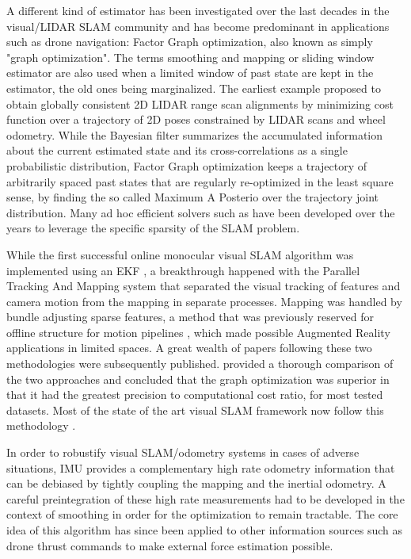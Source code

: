 A different kind of estimator has been investigated over the last decades in the visual/LIDAR SLAM community and has become predominant in applications
such as drone navigation: Factor Graph optimization, also known as simply "graph optimization". The terms smoothing and mapping or sliding window estimator are
also used when a limited window of past state are kept in the estimator, the old ones being marginalized. The earliest example \cite{lu1997globally} 
proposed to obtain globally consistent 2D LIDAR range scan alignments by minimizing cost function over a trajectory of 2D poses constrained by LIDAR scans and wheel odometry.
While the Bayesian filter summarizes the accumulated information about the current estimated state and its cross-correlations as a single probabilistic distribution, 
Factor Graph optimization keeps a trajectory of arbitrarily spaced past states that are regularly re-optimized in the least square sense, by finding the so called 
Maximum A Posterio over the trajectory joint distribution. Many ad hoc efficient solvers such as \cite{grisetti2011g2o, dellaert2012factor, ila2017slam++, ceres-solver} have been developed 
over the years to leverage the specific sparsity of the SLAM problem.

While the first successful online monocular visual SLAM algorithm was implemented using an EKF \cite{davison2007monoslam}, a breakthrough happened with the 
Parallel Tracking And Mapping system \cite{klein2009parallel} that separated the visual tracking of features and camera motion from the 
mapping in separate processes. Mapping was handled by bundle adjusting sparse features, a method that was previously reserved for offline 
structure for motion pipelines \cite{triggs1999bundle}, which made possible Augmented Reality applications in limited spaces. 
A great wealth of papers following these two methodologies were subsequently published. \cite{strasdat2012visual} provided a thorough comparison 
of the two approaches and concluded that the graph optimization was superior in that it had the greatest precision to 
computational cost ratio, for most tested datasets. Most of the state of the art visual SLAM framework now follow this methodology 
\cite{forster2017-TRO, mur2015orb, qin2018vins, leutenegger2015keyframe, ferrera2021ov}.

In order to robustify visual SLAM/odometry systems in cases of adverse situations, IMU provides a complementary high rate odometry information that can 
be debiased by tightly coupling the mapping and the inertial odometry. A careful preintegration \cite{lupton-09,forster2017-TRO} of these high 
rate measurements had to be developed in the context of smoothing in order for the optimization to remain tractable. The core idea of this algorithm has 
since been applied to other information sources such as drone thrust commands \cite{nisar2019vimo} to make external force estimation possible.


